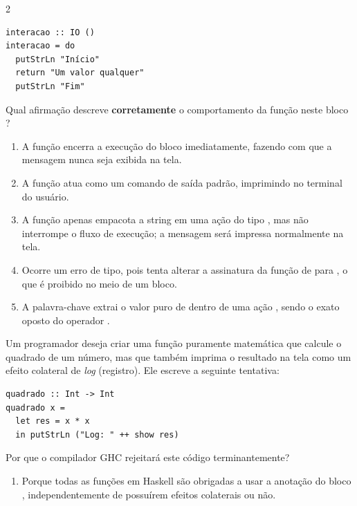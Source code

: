 \documentclass[a4paper,10pt,brazil]{article}
\begin{document}
\begin{multicols}{2}
\begin{verbatim}
interacao :: IO ()
interacao = do
  putStrLn "Início"
  return "Um valor qualquer"
  putStrLn "Fim"
\end{verbatim}

Qual afirmação descreve \textbf{corretamente} o comportamento da função  neste bloco ?

\begin{enumerate}
  \item A função  encerra a execução do bloco  imediatamente, fazendo com que a mensagem  nunca seja exibida na tela.

  \item A função  atua como um comando de saída padrão, imprimindo  no terminal do usuário.

  \item A função  apenas empacota a string em uma ação do tipo , mas não interrompe o fluxo de execução; a mensagem  será impressa normalmente na tela.

  \item Ocorre um erro de tipo, pois  tenta alterar a assinatura da função de  para , o que é proibido no meio de um bloco.

  \item A palavra-chave  extrai o valor puro de dentro de uma ação , sendo o exato oposto do operador \haskellinline{<-}.


\end{enumerate}

Um programador deseja criar uma função puramente matemática que calcule o quadrado de um número, mas que também imprima o resultado na tela como um efeito colateral de \emph{log} (registro). Ele escreve a seguinte tentativa:

\begin{verbatim}
quadrado :: Int -> Int
quadrado x = 
  let res = x * x
  in putStrLn ("Log: " ++ show res)
\end{verbatim}

Por que o compilador GHC rejeitará este código terminantemente?

\begin{enumerate}
  \item Porque todas as funções em Haskell são obrigadas a usar a anotação do bloco , independentemente de possuírem efeitos colaterais ou não.


\end{enumerate}
\end{multicols}
\end{document}
